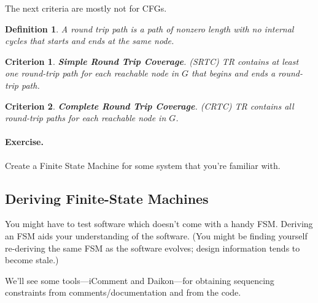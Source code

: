 \documentclass[11pt]{article}
\newtheorem{defn}{Definition}
\newtheorem{crit}{Criterion}
\begin{document}
The next criteria are mostly not for CFGs.
\begin{defn}
A \emph{round trip} path is a path of nonzero length with no internal cycles that starts
and ends at the same node.
\end{defn}

\begin{crit}
{\bf Simple Round Trip Coverage}. (SRTC) \emph{TR} contains at least one
round-trip path for each reachable node in $G$ that begins and ends a
round-trip path.
\end{crit}

\begin{crit}
{\bf Complete Round Trip Coverage}. (CRTC) \emph{TR} contains all round-trip
paths for each reachable node in $G$.
\end{crit}

\paragraph{Exercise.}  Create a Finite State Machine for some system that
you're familiar with.

\subsection*{Deriving Finite-State Machines}
You might have to test software which doesn't come with a handy FSM.
Deriving an FSM aids your understanding of the software. (You might
be finding yourself re-deriving the same FSM as the software evolves;
design information tends to become stale.)

We'll see some tools---iComment and Daikon---for obtaining sequencing constraints from
comments/documentation and from the code.

\end{document}
